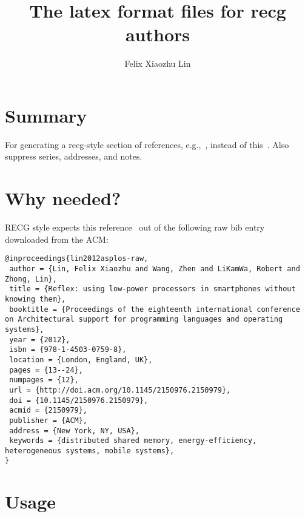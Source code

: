 \documentclass[letterpaper,11pt]{article}
\title{The latex format files for recg authors}
\author{Felix Xiaozhu Lin}
\begin{document}
\maketitle

\section{Summary}

For generating a recg-style section of references, e.g.,~\cite{lin2012asplos}, instead of this~\cite{lin2012asplos-raw}.
Also suppress series, addresses, and notes. 

\section{Why needed?}
RECG style expects this reference~\cite{lin2012asplos} out of the following raw bib entry downloaded from the ACM:

\begin{lstlisting}
@inproceedings{lin2012asplos-raw,
 author = {Lin, Felix Xiaozhu and Wang, Zhen and LiKamWa, Robert and Zhong, Lin},
 title = {Reflex: using low-power processors in smartphones without knowing them},
 booktitle = {Proceedings of the eighteenth international conference on Architectural support for programming languages and operating systems},
 year = {2012},
 isbn = {978-1-4503-0759-8},
 location = {London, England, UK},
 pages = {13--24},
 numpages = {12},
 url = {http://doi.acm.org/10.1145/2150976.2150979},
 doi = {10.1145/2150976.2150979},
 acmid = {2150979},
 publisher = {ACM},
 address = {New York, NY, USA},
 keywords = {distributed shared memory, energy-efficiency, heterogeneous systems, mobile systems},
} 
\end{lstlisting}

\section{Usage}
\end{document}
